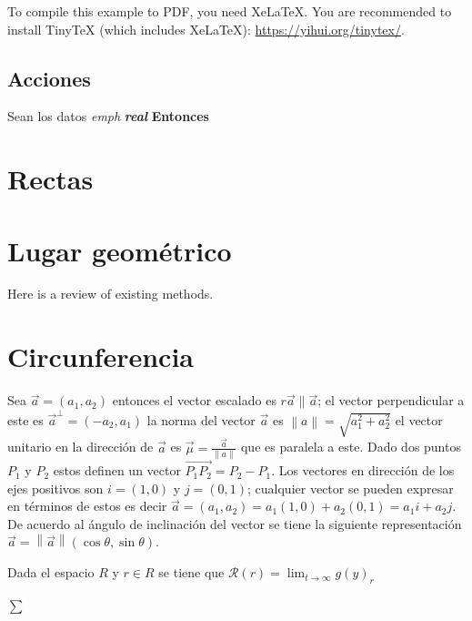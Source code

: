 \documentclass[12pt,]{report}
\theoremstyle{slplain}
\let\BeginKnitrBlock\begin \let\EndKnitrBlock\end
\begin{document}
To compile this example to PDF, you need XeLaTeX. You are recommended to install TinyTeX (which includes XeLaTeX): \url{https://yihui.org/tinytex/}.

\hypertarget{acciones}{%
\section{Acciones}\label{acciones}}

Sean los datos \emph{emph} \textbf{\emph{real}} \textbf{Entonces}

\hypertarget{intro}{%
\chapter{Rectas}\label{intro}}

\hypertarget{lugar-geomuxe9trico}{%
\chapter{Lugar geométrico}\label{lugar-geomuxe9trico}}

Here is a review of existing methods.

\hypertarget{circunferencia}{%
\chapter{Circunferencia}\label{circunferencia}}

Sea \(\vec{a}=(a_1,a_2)\) entonces el vector escalado es \(r\vec{a}\parallel\vec{a}\); el vector perpendicular a este es \(\vec{a}^\perp=(-a_2,a_1)\) la norma del vector \(\vec{a}\) es \(\left\|a\right\|=\sqrt{a_1^2+a_2^2}\) el vector unitario en la dirección de \(\vec{a}\) es \(\vec{\mu}=\frac{\vec{a}}{\left\|a\right\|}\) que es paralela a este. Dado dos puntos \(P_1\) y \(P_2\) estos definen un vector \(\vec{P_1P_2}=P_2-P_1\). Los vectores en dirección de los ejes positivos son \(i=(1,0)\) y \(j=(0,1)\); cualquier vector se pueden expresar en términos de estos es decir \(\vec{a}=(a_1,a_2)=a_1(1,0)+a_2(0,1)=a_1i+a_2j\). De acuerdo al ángulo de inclinación del vector se tiene la siguiente representación \(\vec{a}=\left\|\vec{a}\right\|(\cos\theta,\sin\theta)\).

\BeginKnitrBlock{theorem}[russ]
\protect\hypertarget{thm:www}{}{\label{thm:www} {} }Dada el espacio \(R\) y \(r\in R\) se tiene que \(\mathcal{R}(r)=\lim_{t\to\infty}g(y)_r\)
\EndKnitrBlock{theorem}

\(\sum\)
\end{document}
